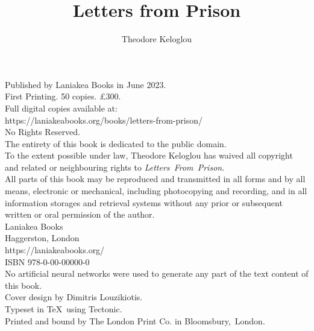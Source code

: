 \documentclass{book}
\title{Letters from Prison}
\author{Theodore Keloglou}
\date{}
\begin{document}
\frontmatter %
\pagestyle{empty} %

\maketitle

\vspace*{\fill}
\begin{center}
{
    \small
    Published by Laniakea Books in June 2023.\\
    \vspace{1em}
    First Printing. 50 copies. £300.\\
    \vspace{1em}
    Full digital copies available at:\\
    https://laniakeabooks.org/books/letters-from-prison/\\
    \vspace{1em}
    No Rights Reserved.\\
    \vspace{1em}
    The entirety of this book is dedicated to the public domain.\\
    \vspace{1em}
    To the extent possible under law, Theodore Keloglou has waived all copyright and related or neighbouring rights to \textit{Letters~From~Prison}.\\
    \vspace{1em}
    All parts of this book may be reproduced and transmitted in all forms and by all means, electronic or mechanical, including photocopying and recording, and in all information storages and retrieval systems without any prior or subsequent written or oral permission of the author.\\
    \vspace{1em}
    Laniakea Books\\
    Haggerston, London\\
    https://laniakeabooks.org/\\
    \vspace{1em}
    ISBN 978-0-00-00000-0\\
    \vspace{1em}
    No artificial neural networks were used to generate any part of the text content of this book.\\
    \vspace{1em}
    Cover design by Dimitris Louzikiotis.\\
    Typeset in \TeX\ using Tectonic.\\
    Printed and bound by The London Print Co. in Bloomsbury,~London.
}
\end{center}
\end{document}

